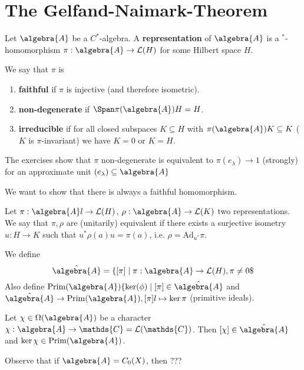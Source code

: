 \documentclass[a4paper]{article}
\begin{document}
\section{The Gelfand-Naimark-Theorem}

\begin{definition}
	Let $\algebra{A}$ be a $C^*$-algebra.
	A \textbf{representation} of $\algebra{A}$ is a $^*$-homomorphism $\pi: \algebra{A} \to \mathcal{L}(H)$ for some Hilbert space $H$.

	
	We say that $\pi$ is
	\begin{enumerate}
		\item \textbf{faithful} if $\pi$ is injective (and therefore isometric).
		\item \textbf{non-degenerate} if $\Span \pi(\algebra{A}) H = H$.
		\item \textbf{irreducible} if for all closed subspaces $K \subseteq H$ with $\pi(\algebra{A})K \subseteq K $ ($K$ is $\pi$-invariant) we have $K = 0$ or $K = H$.
	\end{enumerate}
\end{definition}

\begin{remark}
	The exercises show that $\pi$ non-degenerate is equivalent to $\pi(e_\lambda) \to 1$ (strongly) for an approximate unit $(e_\lambda) \subseteq \algebra{A}$
\end{remark}

We want to show that there is always a faithful homomorphism.

\begin{definition}
	Let $\pi: \algebra{A} l\to \mathcal{L}(H)$, $\rho: \algebra{A} \to \mathcal{L}(K)$ two representations. We say that $\pi, \rho$ are (unitarily) equivalent if there exists a surjective isometry $u: H \to K$ such that $u^* \rho(a) u = \pi(a)$, i.e. $\rho = \mathrm{Ad}_{u^*} \pi$.
\end{definition}

\begin{definition}[Spectrum]
	We define
	\begin{equation*}
		\hat{\algebra{A}} = \{[\pi] \mid \pi: \algebra{A} \to \mathcal{L}(H), \pi \neq 0\$ 
	\end{equation*}
	Also define $\mathrm{Prim}(\algebra{A}) \{ \ker(\phi) \mid [\pi]\in \hat{\algebra{A}}$ and $\hat{\algebra{A}} \to \mathrm{Prim}(\algebra{A}), [\pi]l \mapsto \ker \pi$ (primitive ideals).

	Let $\chi \in \Omega(\algebra{A})$ be a character $\chi: \algebra{A} \to \mathds{C} = \mathcal{L}(\mathds{C})$. Then $[\chi] \in \hat{\algebra{A}}$ and $\ker \chi \in \mathrm{Prim}(\algebra{A})$.

	Observe that if $\algebra{A} = C_0(X)$, then ???
\end{definition}
\end{document}
